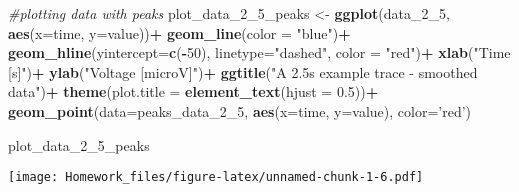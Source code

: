 \documentclass[]{article}
\newenvironment{Shaded}{\begin{snugshade}}{\end{snugshade}}
\newcommand{\KeywordTok}[1]{\textcolor[rgb]{0.13,0.29,0.53}{\textbf{#1}}}
\newcommand{\DataTypeTok}[1]{\textcolor[rgb]{0.13,0.29,0.53}{#1}}
\newcommand{\DecValTok}[1]{\textcolor[rgb]{0.00,0.00,0.81}{#1}}
\newcommand{\FloatTok}[1]{\textcolor[rgb]{0.00,0.00,0.81}{#1}}
\newcommand{\StringTok}[1]{\textcolor[rgb]{0.31,0.60,0.02}{#1}}
\newcommand{\CommentTok}[1]{\textcolor[rgb]{0.56,0.35,0.01}{\textit{#1}}}
\newcommand{\OperatorTok}[1]{\textcolor[rgb]{0.81,0.36,0.00}{\textbf{#1}}}
\newcommand{\NormalTok}[1]{#1}
\begin{document}
\begin{Shaded}
\begin{Highlighting}[]
\CommentTok{#plotting data with peaks}
\NormalTok{plot_data_2_5_peaks <-}\StringTok{ }\KeywordTok{ggplot}\NormalTok{(data_2_}\DecValTok{5}\NormalTok{, }\KeywordTok{aes}\NormalTok{(}\DataTypeTok{x=}\NormalTok{time, }\DataTypeTok{y=}\NormalTok{value))}\OperatorTok{+}
\StringTok{  }\KeywordTok{geom_line}\NormalTok{(}\DataTypeTok{color =} \StringTok{"blue"}\NormalTok{)}\OperatorTok{+}
\StringTok{  }\KeywordTok{geom_hline}\NormalTok{(}\DataTypeTok{yintercept=}\KeywordTok{c}\NormalTok{(}\OperatorTok{-}\DecValTok{50}\NormalTok{), }\DataTypeTok{linetype=}\StringTok{"dashed"}\NormalTok{, }\DataTypeTok{color =} \StringTok{"red"}\NormalTok{)}\OperatorTok{+}
\StringTok{  }\KeywordTok{xlab}\NormalTok{(}\StringTok{"Time [s]"}\NormalTok{)}\OperatorTok{+}
\StringTok{  }\KeywordTok{ylab}\NormalTok{(}\StringTok{"Voltage [microV]"}\NormalTok{)}\OperatorTok{+}
\StringTok{  }\KeywordTok{ggtitle}\NormalTok{(}\StringTok{"A 2.5s example trace - smoothed data"}\NormalTok{)}\OperatorTok{+}
\StringTok{  }\KeywordTok{theme}\NormalTok{(}\DataTypeTok{plot.title =} \KeywordTok{element_text}\NormalTok{(}\DataTypeTok{hjust =} \FloatTok{0.5}\NormalTok{))}\OperatorTok{+}
\StringTok{  }\KeywordTok{geom_point}\NormalTok{(}\DataTypeTok{data=}\NormalTok{peaks_data_2_}\DecValTok{5}\NormalTok{, }\KeywordTok{aes}\NormalTok{(}\DataTypeTok{x=}\NormalTok{time, }\DataTypeTok{y=}\NormalTok{value), }\DataTypeTok{color=}\StringTok{'red'}\NormalTok{)}

\NormalTok{plot_data_2_5_peaks}
\end{Highlighting}
\end{Shaded}

\texttt{[image: Homework\_files/figure-latex/unnamed-chunk-1-6.pdf]}
\end{document}

